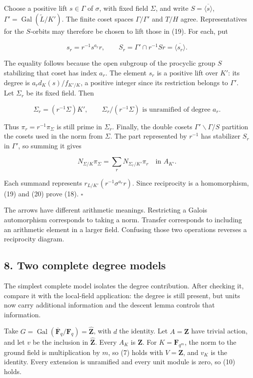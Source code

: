 \documentclass[11pt,a4paper]{article}
\begin{document}
Choose a positive lift \(s\in\Gamma\) of \(\sigma\), with fixed field
\(\Sigma\), and write \(S=\overline{\langle s\rangle}\),
\(\Gamma'=\operatorname{Gal}(\widetilde L/K')\). The finite coset spaces
\(\Gamma/\Gamma'\) and \(T/H\) agree. Representatives for the
\(S\)-orbits may therefore be chosen to lift those in (19). For each,
put

\[
s_r=r^{-1}s^{a_r}r,\qquad
S_r=\Gamma'\cap r^{-1}Sr=\overline{\langle s_r\rangle}.
\]

The equality follows because the open subgroup of the procyclic group
\(S\) stabilizing that coset has index \(a_r\). The element \(s_r\) is a
positive lift over \(K'\): its degree is \(a_r d_K(s)/f_{K'/K}\), a
positive integer since its restriction belongs to \(\Gamma'\). Let
\(\Sigma_r\) be its fixed field. Then

\[
\Sigma_r=(r^{-1}\Sigma)K',
\qquad \Sigma_r/(r^{-1}\Sigma)\text{ is unramified of degree }a_r.
\]

Thus \(\pi_r=r^{-1}\pi_\Sigma\) is still prime in \(\Sigma_r\). Finally,
the double cosets \(\Gamma'\backslash\Gamma/S\) partition the cosets
used in the norm from \(\Sigma\). The part represented by \(r^{-1}\) has
stabilizer \(S_r\) in \(\Gamma'\), so summing it gives

\[
N_{\Sigma/K}\pi_\Sigma
=\sum_r N_{\Sigma_r/K'}\pi_r
\quad\text{in }A_{K'}.
\tag{20}
\]

Each summand represents \(r_{L/K'}(r^{-1}\sigma^{a_r}r)\). Since
reciprocity is a homomorphism, (19) and (20) prove (18). \(\square\)

The arrows have different arithmetic meanings. Restricting a Galois
automorphism corresponds to taking a norm. Transfer corresponds to
including an arithmetic element in a larger field. Confusing those two
operations reverses a reciprocity diagram.

\subsection{8. Two complete degree
models}\label{two-complete-degree-models}

The simplest complete model isolates the degree contribution. After
checking it, compare it with the local-field application: the degree is
still present, but units now carry additional information and the
descent lemma controls that information.

Take
\(G=\operatorname{Gal}(\overline{\mathbf F}_q/\mathbf F_q)=\widehat{\mathbf Z}\),
with \(d\) the identity. Let \(A=\mathbf Z\) have trivial action, and
let \(v\) be the inclusion in \(\widehat{\mathbf Z}\). Every \(A_K\) is
\(\mathbf Z\). For \(K=\mathbf F_{q^m}\), the norm to the ground field
is multiplication by \(m\), so (7) holds with \(V=\mathbf Z\), and
\(v_K\) is the identity. Every extension is unramified and every unit
module is zero, so (10) holds.
\end{document}
